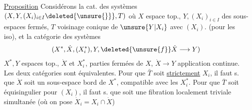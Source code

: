 \uline{Proposition} Considérons la cat. des
systèmes $(X,Y,(X_i)_{i\in I}\deleted{\unsure{\}}},T)$ où
$X$ espace top., $Y,(X_i)_{i\in I}$ des sous-espaces fermés,
$T$ voisinage conique de $\unsure{Y|X_i}$
 avec
$(X_i)$. (pour les iso), et la catégorie
des systèmes
\[
(X^*,\dot X,(X_i^*),Y,
\deleted{\unsure{f}}\dot X\longrightarrow Y)
\]
$X^*,Y$ espaces top., $\dot X$ et $X_i^*$, parties fermées de $X$,
$\dot X\longrightarrow Y$ application continue. Les deux
catégories sont équivalentes.
Pour que $\bar T$
soit \uline{strictement} 
 $X_i$,
il faut s. que $\dot X$ soit un sous-espace bord
de $X^*$,  compatible avec les $X_i^*$.
Pour que $\bar T$ soit équisingulier pour
$(X_i)$, il faut s. que
soit une fibration localement triviale
simultanée (où on pose $\dot X_i=X_i\cap\dot X$)
